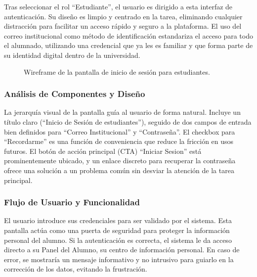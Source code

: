 \begin{samepage}\small
Tras seleccionar el rol ``Estudiante'', el usuario es dirigido a esta interfaz de autenticación. Su diseño es limpio y centrado en la tarea, eliminando cualquier distracción para facilitar un acceso rápido y seguro a la plataforma. El uso del correo institucional como método de identificación estandariza el acceso para todo el alumnado, utilizando una credencial que ya les es familiar y que forma parte de su identidad digital dentro de la universidad.
\begin{figure}[H]\centering
    \caption{Wireframe de la pantalla de inicio de sesión para estudiantes.}\label{fig:wf-login-student}
\end{figure}
    \subsubsection*{Análisis de Componentes y Diseño}
    La jerarquía visual de la pantalla guía al usuario de forma natural. Incluye un título claro (``Inicio de Sesión de estudiantes''), seguido de dos campos de entrada bien definidos para ``Correo Institucional'' y ``Contraseña''. El checkbox para ``Recordarme'' es una función de conveniencia que reduce la fricción en usos futuros. El botón de acción principal (CTA) ``Iniciar Sesion'' está prominentemente ubicado, y un enlace discreto para recuperar la contraseña ofrece una solución a un problema común sin desviar la atención de la tarea principal.
    
    \subsubsection*{Flujo de Usuario y Funcionalidad}
    El usuario introduce sus credenciales para ser validado por el sistema. Esta pantalla actúa como una puerta de seguridad para proteger la información personal del alumno. Si la autenticación es correcta, el sistema le da acceso directo a su Panel del Alumno, su centro de información personal. En caso de error, se mostraría un mensaje informativo y no intrusivo para guiarlo en la corrección de los datos, evitando la frustración.
\normalsize\end{samepage}
\clearpage

